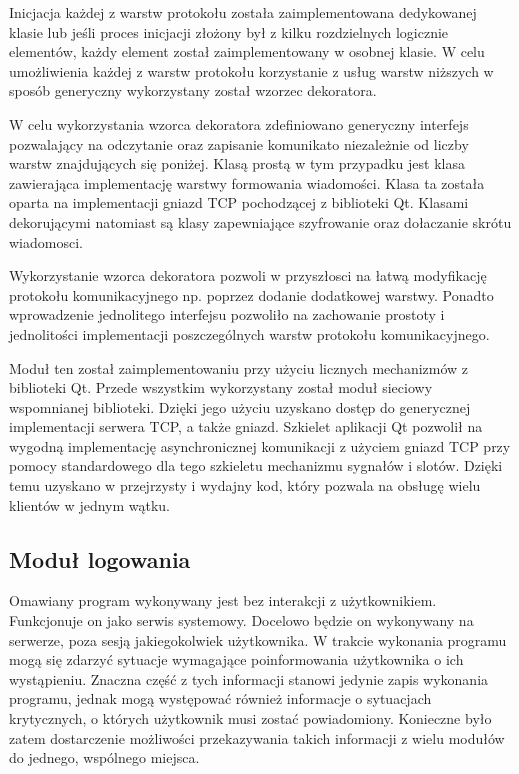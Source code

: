 Inicjacja każdej z warstw protokołu została zaimplementowana
dedykowanej klasie lub jeśli proces inicjacji złożony był z kilku
rozdzielnych logicznie elementów, każdy element został
zaimplementowany w osobnej klasie. W celu umożliwienia każdej z warstw
protokołu korzystanie z usług warstw niższych w sposób generyczny
wykorzystany został wzorzec dekoratora. 

W celu wykorzystania wzorca dekoratora zdefiniowano generyczny
interfejs pozwalający na odczytanie oraz zapisanie komunikato
niezależnie od liczby warstw znajdujących się poniżej. Klasą prostą w
tym przypadku jest klasa zawierająca implementację warstwy formowania
wiadomości. Klasa ta została oparta na implementacji gniazd TCP
pochodzącej z biblioteki Qt. Klasami dekorującymi natomiast są klasy
zapewniające szyfrowanie oraz dołaczanie skrótu wiadomosci.


Wykorzystanie wzorca dekoratora pozwoli w przyszłosci na łatwą
modyfikację protokołu komunikacyjnego np. poprzez dodanie dodatkowej
warstwy. Ponadto wprowadzenie jednolitego interfejsu pozwoliło na
zachowanie prostoty i jednolitości implementacji poszczególnych warstw
protokołu komunikacyjnego.

Moduł ten został zaimplementowaniu przy użyciu licznych mechanizmów z
biblioteki Qt. Przede wszystkim wykorzystany został moduł sieciowy
wspomnianej biblioteki. Dzięki jego użyciu uzyskano dostęp do
generycznej implementacji serwera TCP, a także gniazd. Szkielet
aplikacji Qt pozwolił na wygodną implementację asynchronicznej
komunikacji z użyciem gniazd TCP przy pomocy standardowego dla tego
szkieletu mechanizmu sygnałów i slotów. Dzięki temu uzyskano w
przejrzysty i wydajny kod, który pozwala na obsługę wielu klientów w
jednym wątku.

\subsection[Moduł logowania][Moduł logowania]{Moduł logowania}

Omawiany program wykonywany jest bez interakcji z
użytkownikiem. Funkcjonuje on jako serwis systemowy. Docelowo będzie
on wykonywany na serwerze, poza sesją jakiegokolwiek użytkownika. W
trakcie wykonania programu mogą się zdarzyć sytuacje wymagające
poinformowania użytkownika o ich wystąpieniu. Znaczna część z tych
informacji stanowi jedynie zapis wykonania programu, jednak mogą
występować również informacje o sytuacjach krytycznych, o których
użytkownik musi zostać powiadomiony. Konieczne było zatem dostarczenie
możliwości przekazywania takich informacji z wielu modułów do jednego,
wspólnego miejsca.

